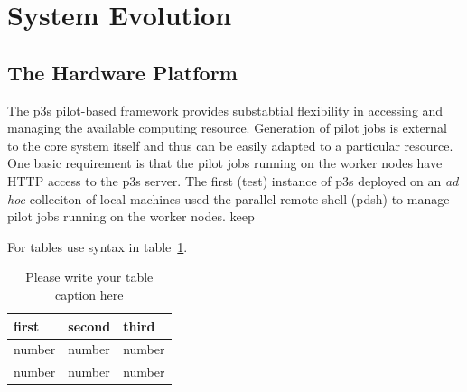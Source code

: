 \documentclass{webofc}
\begin{document}
\section{System Evolution}

\subsection{The Hardware Platform}
\label{sec:hardware}

The p3s pilot-based framework provides substabtial flexibility in accessing and
managing the available computing resource. Generation of pilot jobs is external
to the core system itself and thus can be easily adapted to a particular resource.
One basic requirement is that the pilot jobs running on the worker nodes have
HTTP access to the p3s server. The first (test) instance of p3s deployed
on an \textit{ad hoc} colleciton of local machines used the parallel remote shell
(pdsh) to manage pilot jobs running on the worker nodes.
keep


For tables use syntax in table~\ref{tab-1}.
\begin{table}
\centering
\caption{Please write your table caption here}
\label{tab-1}       %
\begin{tabular}{lll}
\hline
first & second & third  \\\hline
number & number & number \\
number & number & number \\\hline
\end{tabular}
\vspace*{5cm}  %
\end{table}
\end{document}
